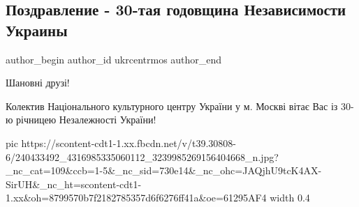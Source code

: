  
 
 
 
 
 
\subsection{Поздравление - 30-тая годовщина Независимости Украины}
\label{sec:24_08_2021.fb.ukrcentrmos.1.pozdravlenie_nezalezhnist}
 
\ifcmt
 author_begin
   author_id ukrcentrmos
 author_end
\fi

Шановні друзі!

Колектив Національного культурного центру України у м. Москві вітає Вас із 30-ю
річницею Незалежності України!

\ifcmt
  pic https://scontent-cdt1-1.xx.fbcdn.net/v/t39.30808-6/240433492_4316985335060112_3239985269156404668_n.jpg?_nc_cat=109&ccb=1-5&_nc_sid=730e14&_nc_ohc=JAQjhU9tcK4AX-SirUH&_nc_ht=scontent-cdt1-1.xx&oh=8799570b7f2182785357d6f6276ff41a&oe=61295AF4
  width 0.4
\fi
